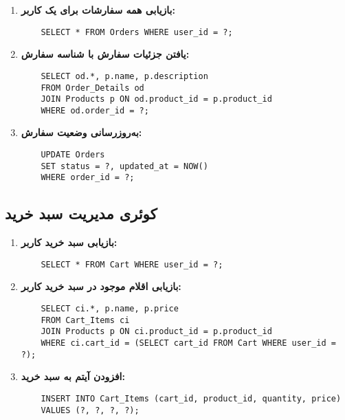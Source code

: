 \documentclass[12pt]{article}
\begin{document}
\begin{enumerate}
    \item \textbf{بازیابی همه سفارشات برای یک کاربر:}
    \begin{latin}
    \begin{verbatim}
    SELECT * FROM Orders WHERE user_id = ?;
    \end{verbatim}
    \end{latin}
    
    \item \textbf{یافتن جزئیات سفارش با شناسه سفارش:}
    \begin{latin}
    \begin{verbatim}
    SELECT od.*, p.name, p.description
    FROM Order_Details od
    JOIN Products p ON od.product_id = p.product_id
    WHERE od.order_id = ?;
    \end{verbatim}
    \end{latin}
    
    \item \textbf{به‌روزرسانی وضعیت سفارش:}
    \begin{latin}
    \begin{verbatim}
    UPDATE Orders
    SET status = ?, updated_at = NOW()
    WHERE order_id = ?;
    \end{verbatim}
    \end{latin}
\end{enumerate}

\subsection{کوئری مدیریت سبد خرید}

\begin{enumerate}
    \item \textbf{بازیابی سبد خرید کاربر:}
    \begin{latin}
    \begin{verbatim}
    SELECT * FROM Cart WHERE user_id = ?;
    \end{verbatim}
    \end{latin}
    
    \item \textbf{بازیابی اقلام موجود در سبد خرید کاربر:}
    \begin{latin}
    \begin{verbatim}
    SELECT ci.*, p.name, p.price
    FROM Cart_Items ci
    JOIN Products p ON ci.product_id = p.product_id
    WHERE ci.cart_id = (SELECT cart_id FROM Cart WHERE user_id = ?);
    \end{verbatim}
    \end{latin}
    
    \item \textbf{افزودن آیتم به سبد خرید:}
    \begin{latin}
    \begin{verbatim}
    INSERT INTO Cart_Items (cart_id, product_id, quantity, price)
    VALUES (?, ?, ?, ?);
    \end{verbatim}
    \end{latin}
\end{enumerate}
\end{document}
